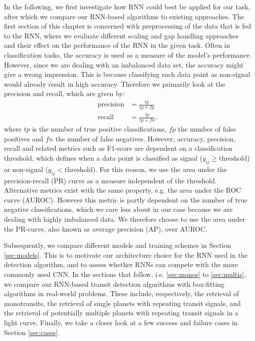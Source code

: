 In the following, we first investigate how RNN could best be applied for our task, after which we compare our RNN-based algorithms to existing approaches. The first section of this chapter is concerned with preprocessing of the data that is fed to the RNN, where we evaluate different scaling and gap handling approaches and their effect on the performance of the RNN in the given task. Often in classification tasks, the accuracy is used as a measure of the model's performance. However, since we are dealing with an imbalanced data set, the accuracy might give a wrong impression. This is because classifying each data point as non-signal would already result in high accuracy. Therefore we primarily look at the precision and recall, which are given by:
\begin{align}
    \text{precision} &= \frac{tp}{tp + fp}\\
    \text{recall} &= \frac{tp}{tp + fn},
\end{align}
where $tp$ is the number of true positive classifications, $fp$ the number of false positives and $fn$ the number of false negatives.  However, accuracy, precision, recall and related metrics such as F1-score are dependent on a classification threshold, which defines when a data point is classified as signal ($y_{ij} \geq \text{threshold}$) or non-signal ($y_{ij} < \text{threshold}$). For this reason, we use the area under the precision-recall (PR) curve as a measure independent of the threshold. Alternative metrics exist with the same property, e.g. the area under the ROC curve (AUROC). However this metric is partly dependent on the number of true negative classifications, which we care less about in our case because we are dealing with highly imbalanced data. We therefore choose to use the area under the PR-curve, also known as average precision (AP), over AUROC.

Subsequently, we compare different models and training schemes in Section \ref{sec:models}. This is to motivate our architecture choice for the RNN used in the detection algorithm, and to assess whether RNNs can compete with the more commonly used CNN. In the sections that follow, i.e. \ref{sec:monos} to \ref{sec:multis}, we compare our RNN-based transit detection algorithms with box-fitting algorithms in real-world problems. These include, respectively, the retrieval of monotransits, the retrieval of single planets with repeating transit signals, and the retrieval of potentially multiple planets with repeating transit signals in a light curve. Finally, we take a closer look at a few success and failure cases in Section \ref{sec:cases}.
